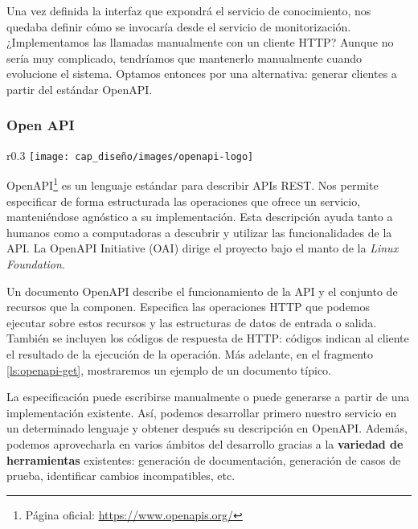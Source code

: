 Una vez definida la interfaz que expondrá el servicio de conocimiento, nos quedaba definir cómo se invocaría desde el servicio de monitorización. ¿Implementamos las llamadas manualmente con un cliente HTTP? Aunque no sería muy complicado, tendríamos que mantenerlo manualmente cuando evolucione el sistema. Optamos entonces por una alternativa: generar clientes a partir del estándar OpenAPI.

\subsubsection{Open API}
\label{chap:OpenAPI}

\begin{wrapfigure}{r}{0.3\linewidth}
  \vspace{5pt}
  \texttt{[image: cap\_diseño/images/openapi-logo]}
  \centering
  \vspace{5pt}
\end{wrapfigure}

OpenAPI\footnote{Página oficial: \url{https://www.openapis.org/}} es un lenguaje estándar para describir APIs REST. Nos permite especificar de forma estructurada las operaciones que ofrece un servicio, manteniéndose agnóstico a su implementación. Esta descripción ayuda tanto a humanos como a computadoras a descubrir y utilizar las funcionalidades de la API.\cite{openapi_initiativeOpenAPISpecificationV3} La OpenAPI Initiative (OAI) dirige el proyecto bajo el manto de la \emph{Linux Foundation}.

Un documento OpenAPI describe el funcionamiento de la API y el conjunto de recursos que la componen. Especifica las operaciones HTTP que podemos ejecutar sobre estos recursos y las estructuras de datos de entrada o salida. También se incluyen los códigos de respuesta de HTTP: códigos indican al cliente el resultado de la ejecución de la operación. \cite{openapi_initiativeOpenAPISpecificationV3} Más adelante, en el fragmento \ref{ls:openapi-get}, mostraremos un ejemplo de un documento típico.

La especificación puede escribirse manualmente o puede generarse a partir de una implementación existente. Así, podemos desarrollar primero nuestro servicio en un determinado lenguaje y obtener después su descripción en OpenAPI. Además, podemos aprovecharla en varios ámbitos del desarrollo gracias a la  \textbf{variedad de herramientas} existentes: generación de documentación, generación de casos de prueba, identificar cambios incompatibles, etc. \cite{westerveldChapterOpenAPIAPI2021}

